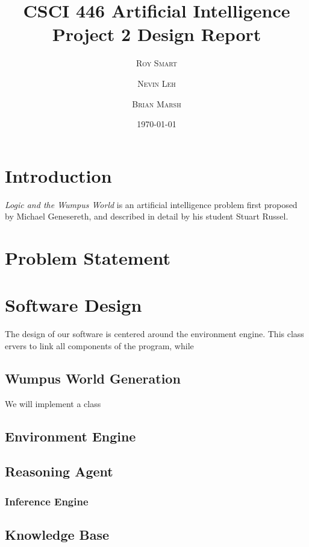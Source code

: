 \documentclass{article}
\title{\vspace{-15mm}\fontsize{24pt}{10pt}\selectfont\textbf{CSCI 446 Artificial Intelligence \\[2mm] Project 2 Design Report} } %
\date{\today}
\author{
\large
\textsc{Roy Smart} \and \textsc{Nevin Leh} \and \textsc{Brian Marsh}\\[2mm] %
}
\begin{document}
	\maketitle %
	\thispagestyle{fancy} %
	\normalsize

	\section{Introduction}
	
		\textit{Logic and the Wumpus World} is an artificial intelligence problem first proposed by Michael Genesereth, and described in detail by his student Stuart Russel\cite{ai}.
	
	\section{Problem Statement}
	
	
	
	\section{Software Design}
	
		The design of our software is centered around the environment engine. This class ervers to link all components of the program, while
		
		\subsection{Wumpus World Generation}
		
		We will implement a class
		
		\subsection{Environment Engine}
		
		\subsection{Reasoning Agent}
		
			\subsubsection{Inference Engine}
			
			\subsection{Knowledge Base}
			
\end{document}
